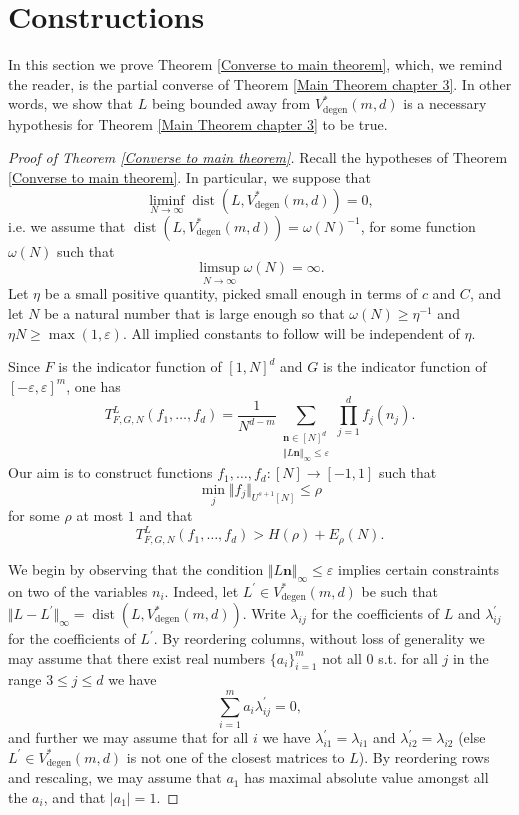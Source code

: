 \documentclass[12pt,a4paper,twoside,reqno]{amsart}
\newcommand{\degen}{\operatorname{degen}}
\numberwithin{equation}{section}
\begin{document}
\section{Constructions}
\label{Constructions}
In this section we prove Theorem \ref{Converse to main theorem}, which, we remind the reader, is the partial converse of Theorem \ref{Main Theorem chapter 3}. In other words, we show that $L$ being bounded away from $V_{\degen}^*(m,d)$ is a necessary hypothesis for Theorem \ref{Main Theorem chapter 3} to be true.  


\begin{proof}[Proof of Theorem \ref{Converse to main theorem}]
Recall the hypotheses of Theorem \ref{Converse to main theorem}. In particular, we suppose that $$\liminf\limits_{N\rightarrow\infty}\operatorname{dist}(L,V^*_{\degen}(m,d)) = 0,$$ i.e. we assume that $\operatorname{dist}(L,V_{\degen}^*(m,d)) = \omega(N)^{-1}$, for some function $\omega(N)$ such that $$\limsup_{N\rightarrow\infty} \omega(N) = \infty.$$  Let $\eta$ be a small positive quantity, picked small enough in terms of $c$ and $C$, and let $N$ be a natural number that is large enough so that $\omega(N)\geqslant \eta^{-1}$ and $\eta N\geqslant \operatorname{max}(1,\varepsilon)$. All implied constants to follow will be independent of $\eta$. 

Since $F$ is the indicator function of $[1,N]^d$ and $G$ is the indicator function of $[-\varepsilon,\varepsilon]^m$, one has \[T_{F,G,N}^L(f_1,\dots,f_d) = \frac{1}{N^{d-m}} \sum\limits_{\substack{\mathbf{n} \in [N]^d \\ \Vert L\mathbf{n} \Vert_\infty \leqslant \varepsilon}} \prod\limits_{j=1}^d f_j(n_j).\] Our aim is to construct functions $f_1,\dots,f_d:[N] \longrightarrow [-1,1]$ such that \[ \min_j\Vert f_j\Vert_{U^{s+1}[N]} \leqslant \rho\] for some $\rho$ at most $1$ and that \begin{equation}
\label{conclusion repeated}
T_{F,G,N}^L(f_1,\dots,f_d) > H(\rho) + E_\rho(N).
\end{equation} 

We begin by observing that the condition $\Vert L\mathbf{n}\Vert_\infty\leqslant \varepsilon$ implies certain constraints on two of the variables $n_i$. Indeed, let $L^\prime\in V_{\degen}^*(m,d)$ be such that $\Vert L - L^\prime \Vert_\infty = \operatorname{dist}(L,V_{\degen}^*(m,d))$. Write $\lambda_{ij}$ for the coefficients of $L$ and $\lambda_{ij}^\prime$ for the coefficients of $L^\prime$. By reordering columns, without loss of generality we may assume that there exist real numbers $\{a_i\}_{i=1}^m$ not all 0 s.t. for all $j$ in the range $3\leqslant j\leqslant d$ we have  
\begin{equation}
\label{all but 2 columns degenerate}
\sum\limits_{i=1}^m a_i \lambda^{\prime}_{ij} = 0,
\end{equation} and further we may assume that for all $i$ we have $\lambda^\prime_{i1} = \lambda_{i1}$ and $\lambda^\prime_{i2} = \lambda_{i2}$ (else $L^\prime\in V_{\degen}^*(m,d)$ is not one of the closest matrices to $L$). By reordering rows and rescaling, we may assume that $a_1$ has maximal absolute value amongst all the $a_i$, and that $\vert a_1\vert = 1$. 


\end{proof}
\end{document}
